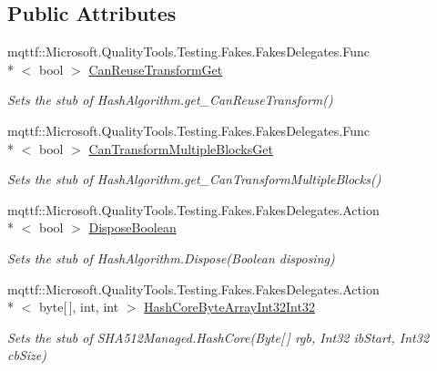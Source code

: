\subsection*{Public Attributes}
\begin{DoxyCompactItemize}
\item 
mqttf\-::\-Microsoft.\-Quality\-Tools.\-Testing.\-Fakes.\-Fakes\-Delegates.\-Func\\*
$<$ bool $>$ \hyperlink{class_system_1_1_security_1_1_cryptography_1_1_fakes_1_1_stub_s_h_a512_managed_ac494e96665fd5b52ef0ce92386922513}{Can\-Reuse\-Transform\-Get}
\begin{DoxyCompactList}\small\item\em Sets the stub of Hash\-Algorithm.\-get\-\_\-\-Can\-Reuse\-Transform()\end{DoxyCompactList}\item 
mqttf\-::\-Microsoft.\-Quality\-Tools.\-Testing.\-Fakes.\-Fakes\-Delegates.\-Func\\*
$<$ bool $>$ \hyperlink{class_system_1_1_security_1_1_cryptography_1_1_fakes_1_1_stub_s_h_a512_managed_a6c24f2c171e7bc4a80861eda3da43e3a}{Can\-Transform\-Multiple\-Blocks\-Get}
\begin{DoxyCompactList}\small\item\em Sets the stub of Hash\-Algorithm.\-get\-\_\-\-Can\-Transform\-Multiple\-Blocks()\end{DoxyCompactList}\item 
mqttf\-::\-Microsoft.\-Quality\-Tools.\-Testing.\-Fakes.\-Fakes\-Delegates.\-Action\\*
$<$ bool $>$ \hyperlink{class_system_1_1_security_1_1_cryptography_1_1_fakes_1_1_stub_s_h_a512_managed_a002da9e2f8e221f2c1d86dd262ef8fe3}{Dispose\-Boolean}
\begin{DoxyCompactList}\small\item\em Sets the stub of Hash\-Algorithm.\-Dispose(\-Boolean disposing)\end{DoxyCompactList}\item 
mqttf\-::\-Microsoft.\-Quality\-Tools.\-Testing.\-Fakes.\-Fakes\-Delegates.\-Action\\*
$<$ byte\mbox{[}$\,$\mbox{]}, int, int $>$ \hyperlink{class_system_1_1_security_1_1_cryptography_1_1_fakes_1_1_stub_s_h_a512_managed_a09c1f4acfb66885cc5d59b093a713ce8}{Hash\-Core\-Byte\-Array\-Int32\-Int32}
\begin{DoxyCompactList}\small\item\em Sets the stub of S\-H\-A512\-Managed.\-Hash\-Core(\-Byte\mbox{[}$\,$\mbox{]} rgb, Int32 ib\-Start, Int32 cb\-Size)\end{DoxyCompactList}\item 

\end{DoxyCompactItemize}
